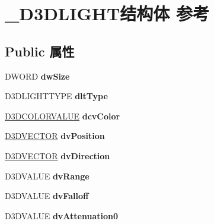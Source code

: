 \hypertarget{struct___d3_d_l_i_g_h_t}{}\section{\+\_\+\+D3\+D\+L\+I\+G\+H\+T结构体 参考}
\label{struct___d3_d_l_i_g_h_t}
\subsection*{Public 属性}
\begin{DoxyCompactItemize}
\item 
\mbox{\label{struct___d3_d_l_i_g_h_t_a7da61369bc494a51442a2327441c692a}} 
D\+W\+O\+RD {\bfseries dw\+Size}
\item 
\mbox{\label{struct___d3_d_l_i_g_h_t_a606d24efcf4b6ca3e12001beb78c4872}} 
D3\+D\+L\+I\+G\+H\+T\+T\+Y\+PE {\bfseries dlt\+Type}
\item 
\mbox{\label{struct___d3_d_l_i_g_h_t_ab81d2112930d2c3ec7811daa65e5fbda}} 
\hyperlink{struct___d3_d_c_o_l_o_r_v_a_l_u_e}{D3\+D\+C\+O\+L\+O\+R\+V\+A\+L\+UE} {\bfseries dcv\+Color}
\item 
\mbox{\label{struct___d3_d_l_i_g_h_t_aa5069647937509dcd2e43153f049568d}} 
\hyperlink{struct___d3_d_v_e_c_t_o_r}{D3\+D\+V\+E\+C\+T\+OR} {\bfseries dv\+Position}
\item 
\mbox{\label{struct___d3_d_l_i_g_h_t_a0e07b2cbffe8f3de6e4202f56d805a65}} 
\hyperlink{struct___d3_d_v_e_c_t_o_r}{D3\+D\+V\+E\+C\+T\+OR} {\bfseries dv\+Direction}
\item 
\mbox{\label{struct___d3_d_l_i_g_h_t_ad31a1eab9781abb02221e8921f389661}} 
D3\+D\+V\+A\+L\+UE {\bfseries dv\+Range}
\item 
\mbox{\label{struct___d3_d_l_i_g_h_t_ab5f6583d96ddd43d519dec5128c5c2b7}} 
D3\+D\+V\+A\+L\+UE {\bfseries dv\+Falloff}
\item 
\mbox{\label{struct___d3_d_l_i_g_h_t_a918de9c8d0cf7231e0ec8da1439d7aa4}} 
D3\+D\+V\+A\+L\+UE {\bfseries dv\+Attenuation0}

\end{DoxyCompactItemize}
